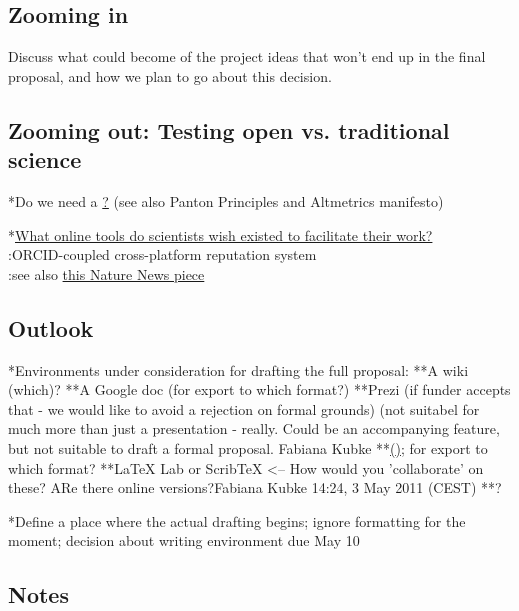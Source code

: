 \documentclass[final,authoryear,3p]{elsarticle-open-drafting}
\begin{document}
\subsection{Zooming in}
Discuss what could become of the project ideas that won't end up in the final proposal, and how we plan to go about this decision.

\subsection{Zooming out: Testing open vs. traditional science}

*Do we need a \href{http://open-science.pen.io/ manifesto for open science}? (see also Panton Principles and Altmetrics manifesto)

*\href{http://www.quora.com/What-online-tools-do-scientists-wish-existed-to-facilitate-their-work/answer/Marius-Kempe}{What online tools do scientists wish existed to facilitate their work?}\\
:ORCID-coupled cross-platform reputation system\\
:see also \href{http://www.nature.com/news/2011/110511/full/473138a.html}{this Nature News piece}

\subsection{Outlook}



*Environments under consideration for drafting the full proposal:
**A wiki (which)?
**A Google doc (for export to which format?)
**Prezi (if funder accepts that - we would like to avoid a rejection on formal grounds) (not suitabel for much more than just a presentation - really. Could be an accompanying feature, but not suitable to draft a formal proposal. Fabiana Kubke
**\href{https://github.com/Daniel-Mietchen/Open-Research-Proposals GitHub} (\href{http://marciovm.com/i-want-a-github-of-science background}); for export to which format?
**LaTeX Lab or ScribTeX <-- How would you 'collaborate' on these? ARe there online versions?Fabiana Kubke 14:24, 3 May 2011 (CEST)
**?

*Define a place where the actual drafting begins; ignore formatting for the moment; decision about writing environment due May 10

\subsection{Notes}
\end{document}

